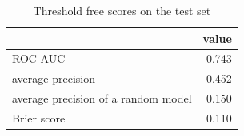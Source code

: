 \begin{table}[htbp]
\centering
\caption{Threshold free scores on the test set}
\label{tab:q8_test_scores}
\begin{tabular}{lr}
\toprule
 & value \\
\midrule
ROC AUC & 0.743 \\
average precision & 0.452 \\
average precision of a random model & 0.150 \\
Brier score & 0.110 \\
\bottomrule
\end{tabular}
\end{table}

